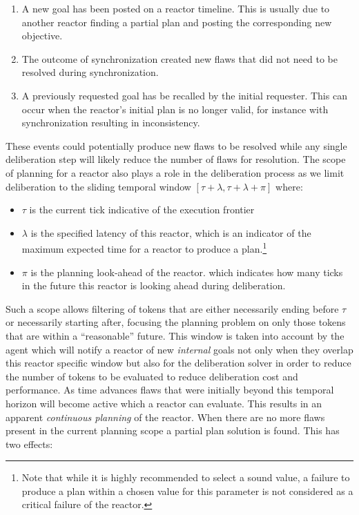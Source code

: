 \begin{enumerate}

\item A new goal has been posted on a reactor timeline. This is
  usually due to another reactor finding a partial plan and posting
  the corresponding new objective.

\item The outcome of synchronization created new flaws that did not
  need to be resolved during synchronization.

\item A previously requested goal has be recalled by the initial
  requester. This can occur when the reactor's initial plan is no
  longer valid, for instance with synchronization resulting in
  inconsistency.

\end{enumerate}

These events could potentially produce new flaws to be resolved while
any single deliberation step will likely reduce the number of flaws
for resolution. The scope of planning for a reactor also plays a role
in the deliberation process as we limit deliberation to the sliding
temporal window $[\tau+\lambda, \tau+\lambda+\pi]$ \cite{py10} where:

\begin{itemize}

\item $\tau$ is the current tick indicative of the execution frontier 

\item $\lambda$ is the specified latency of this reactor, which is an
  indicator of the maximum expected time for a reactor to produce a
  plan.\footnote{Note that while it is highly recommended to select a
    sound value, a failure to produce a plan within a chosen value for
    this parameter is not considered as a critical failure of the
    reactor.}

\item $\pi$ is the planning look-ahead of the reactor. which indicates
  how many ticks in the future this reactor is looking ahead during
  deliberation. 

\end{itemize}

 Such a
scope allows filtering of tokens that are either necessarily ending
before $\tau$ or necessarily starting after, focusing the planning
problem on only those tokens that are within a ``reasonable''
future. This window is taken into account by the \rx agent which will
notify a reactor of new {\em internal} goals not only when they
overlap this reactor specific window but also for the deliberation
solver in order to reduce the number of tokens to be evaluated to
reduce deliberation cost and performance. As time advances flaws that
were initially beyond this temporal horizon will become active which a
reactor can evaluate. This results in an apparent \emph{continuous
  planning} of the reactor. When there are no more flaws present in
the current planning scope a partial plan solution is found. This has
two effects:

